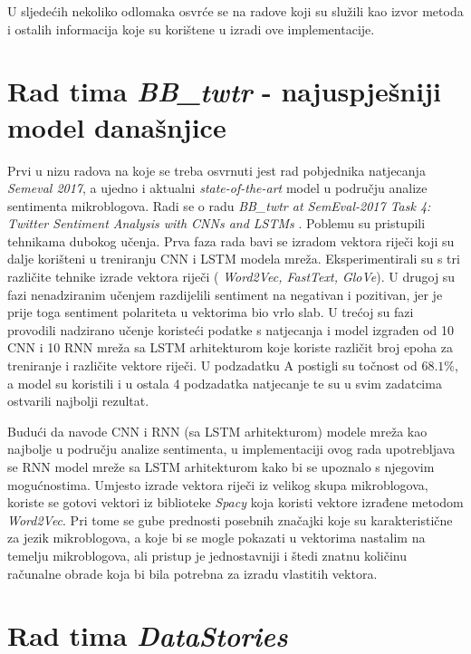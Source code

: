 \documentclass[times, utf8, zavrsni]{fer}
\begin{document}
U sljedećih nekoliko odlomaka osvrće se na radove koji su služili kao izvor metoda i ostalih informacija koje su korištene u izradi ove implementacije.

\section{Rad tima \emph{BB\_twtr} - najuspješniji model današnjice}

Prvi u nizu radova na koje se treba osvrnuti jest rad pobjednika natjecanja \emph{Semeval 2017}, a ujedno i aktualni \textit{state-of-the-art} model u području analize sentimenta mikroblogova. Radi se o radu \textit{BB\_twtr at SemEval-2017 Task 4: Twitter Sentiment Analysis with CNNs and LSTMs} \citep{cliche-2017-bb}. Poblemu su pristupili tehnikama dubokog učenja. Prva faza rada bavi se izradom vektora riječi koji su dalje korišteni u treniranju CNN i LSTM modela mreža. Eksperimentirali su s tri različite tehnike izrade vektora riječi ( \textit{Word2Vec, FastText, GloVe}). U drugoj su fazi nenadziranim učenjem razdijelili sentiment na negativan i pozitivan, jer je prije toga sentiment polariteta u vektorima bio vrlo slab. U trećoj su fazi provodili nadzirano učenje koristeći podatke s natjecanja i model izgrađen od 10 \gls{CNN} i 10 \gls{RNN} mreža sa \gls{LSTM} arhitekturom koje koriste različit broj epoha za treniranje i različite vektore riječi. U podzadatku A postigli su točnost od $68.1\%$, a model su koristili i u ostala 4 podzadatka natjecanje te su u svim zadatcima ostvarili najbolji rezultat.

Budući da navode \gls{CNN} i \gls{RNN} (sa \gls{LSTM} arhitekturom) modele mreža kao najbolje u području analize sentimenta, u implementaciji ovog rada upotrebljava se \gls{RNN} model mreže sa \gls{LSTM} arhitekturom kako bi se upoznalo s njegovim mogućnostima. Umjesto izrade vektora riječi iz velikog skupa mikroblogova, koriste se gotovi vektori iz biblioteke \textit{Spacy} koja koristi vektore izrađene metodom \textit{Word2Vec}. Pri tome se gube prednosti posebnih značajki koje su karakteristične za jezik mikroblogova, a koje bi se mogle pokazati u vektorima nastalim na temelju mikroblogova, ali pristup je jednostavniji i štedi znatnu količinu računalne obrade koja bi bila potrebna za izradu vlastitih vektora.

\section{Rad tima \emph{DataStories}}
\end{document}
